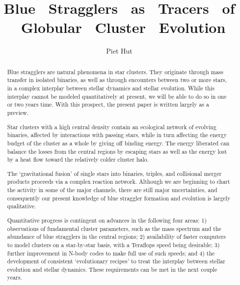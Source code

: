 %
%
\def\undertext#1{{$\underline{\hbox{#1}}$}}
\def\doubleundertext#1{{$\underline{\underline{\hbox{#1}}}$}}
\def\half{{\scriptstyle {1 \over 2}}}
\def\ie{{\it {\frenchspacing i.{\thinspace}e. }}}
\def\eg{{\frenchspacing e.{\thinspace}g. }}
\def\cf{{\frenchspacing\it cf. }}
\def\etal{{\frenchspacing\it et al.}}
\def\simlt{\hbox{ \rlap{\raise 0.425ex\hbox{$<$}}\lower 0.65ex\hbox{$\sim$} }}
\def\simgt{\hbox{ \rlap{\raise 0.425ex\hbox{$>$}}\lower 0.65ex\hbox{$\sim$} }}
\def\solar{\odot}
\def\Rf{\parindent=0pt\medskip\hangindent=3pc\hangafter=1}
%
%


\title{Blue \ Stragglers \ as \ Tracers \ of \ Globular \ Cluster \ Evolution}
\author{Piet Hut}

\begin{abstract}
Blue stragglers are natural phenomena in star clusters.  They
originate through mass transfer in isolated binaries, as well as
through encounters between two or more stars, in a complex interplay
between stellar dynamics and stellar evolution.  While this interplay
cannot be modeled quantitatively at present, we will be able to do so
in one or two years time.  With this prospect, the present paper is
written largely as a preview.

Star clusters with a high central density contain an ecological
network of evolving binaries, affected by interactions with passing
stars, while in turn affecting the energy budget of the cluster as a
whole by giving off binding energy.  The energy liberated can balance
the losses from the central regions by escaping stars as well as
the energy lost by a heat flow toward the relatively colder cluster halo.

The `gravitational fusion' of single stars into binaries, triples, and
collisional merger products proceeds via a complex reaction network.
Although we are beginning to chart the activity in some of the major
channels, there are still major uncertainties, and consequently our present
knowledge of blue straggler formation and evolution is largely qualitative.

Quantitative progress is contingent on advances in the following four
areas: 1) observations of fundamental cluster parameters, such as the
mass spectrum and the abundance of blue stragglers in the central regions;
2) availability of faster computers to model clusters on a star-by-star basis,
with a Teraflops speed being desirable; 3) further improvement in N-body codes
to make full use of such speeds; and 4) the development of consistent
`evolutionary recipes' to treat the interplay between stellar
evolution and stellar dynamics.  These requirements can be met in the
next couple years.
\end{abstract}

